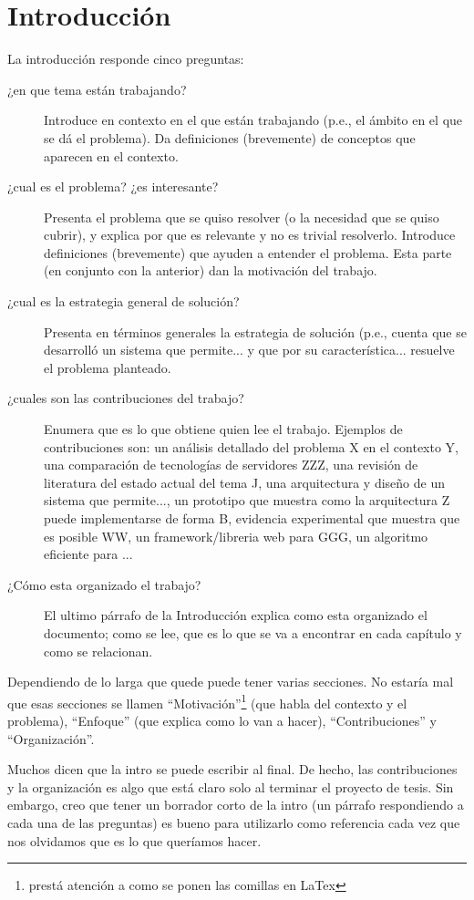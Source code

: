 \chapter{Introducción}
\label{introduccion}

La introducción responde cinco preguntas:
\begin{description}
\item[¿en que tema están trabajando? ] Introduce en contexto en el que están trabajando (p.e., el ámbito en el que se dá el problema). Da definiciones (brevemente) de conceptos que aparecen en el contexto. 
\item[¿cual es el problema? ¿es interesante? ] Presenta el problema que se quiso resolver (o la necesidad que se quiso cubrir), y explica por que es relevante y no es trivial resolverlo.  Introduce definiciones (brevemente) que ayuden a entender el problema. Esta parte (en conjunto con la anterior) dan la motivación del trabajo. 
\item[¿cual es la estrategia general de solución? ] Presenta en términos generales la estrategia de solución (p.e., cuenta que se desarrolló un sistema que permite... y que por su característica... resuelve el problema planteado.
\item[¿cuales son las contribuciones del trabajo? ] Enumera que es lo que obtiene quien lee el trabajo. Ejemplos de contribuciones son: un análisis detallado del problema X en el contexto Y, una comparación de tecnologías de servidores ZZZ, una revisión de literatura del estado actual del tema J, una arquitectura y diseño de un sistema que permite..., un prototipo que muestra como la arquitectura Z puede implementarse de forma B, evidencia experimental que muestra que es posible WW, un framework/libreria web para GGG, un algoritmo eficiente para ...   
\item[¿Cómo esta organizado el trabajo?] El ultimo párrafo de la Introducción explica como esta organizado el documento; como se lee, que es lo que se va a encontrar en cada capítulo y como se relacionan.   
\end{description}

Dependiendo de lo larga que quede puede tener varias secciones. No estaría mal que esas secciones se llamen ``Motivación''\footnote{prestá atención a como se ponen las comillas en LaTex} (que habla del contexto y el problema), ``Enfoque'' (que explica como lo van a hacer), ``Contribuciones'' y ``Organización''.  

Muchos dicen que la intro se puede escribir al final. De hecho, las contribuciones y la organización es algo que está claro solo al terminar el proyecto de tesis. Sin embargo, creo que tener un borrador corto de la intro (un párrafo respondiendo a cada una de las preguntas) es bueno para utilizarlo como referencia cada vez que nos olvidamos que es lo que queríamos hacer. 


